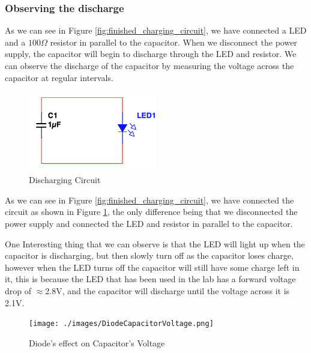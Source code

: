 \documentclass[a4paper, 10pt]{article}
\begin{document}
						\subsubsection{Observing the discharge}
							As we can see in Figure \ref{fig:finished_charging_circuit}, we have connected a LED and a $100 \Omega$ resistor in parallel to the capacitor.
							When we disconnect the power supply, the capacitor will begin to discharge through the LED and resistor.
							We can observe the discharge of the capacitor by measuring the voltage across the capacitor at regular intervals.

							\begin{figure}[h!]
								\centering
								\includegraphics[width=0.5\textwidth]{./images/Discharging_Circuit.png}
								\caption{Discharging Circuit}
								\label{fig:discharging_circuit}
							\end{figure}


							As we can see in Figure \ref{fig:finished_charging_circuit}, we have connected the circuit as 
							shown in Figure \ref{fig:discharging_circuit}, the only difference being that we
							disconnected the power supply and connected the LED and resistor in parallel to the capacitor.

							\vspace*{5mm}
							One Interesting thing that we can observe is that the LED will light up when the capacitor is discharging, but then slowly turn off as the capacitor loses charge, however when the LED
							turns off the capacitor will still have some charge left in it, this is because the LED that has been used in the lab has a forward voltage drop of $\approx$2.8V,
							and the capacitor will discharge until the voltage across it is 2.1V.

							\begin{figure}
								\centering
								\texttt{[image: ./images/DiodeCapacitorVoltage.png]}
								\caption{Diode's effect on Capacitor's Voltage}
								\label{fig:diode_capacitor_voltage}
							\end{figure}
\end{document}

